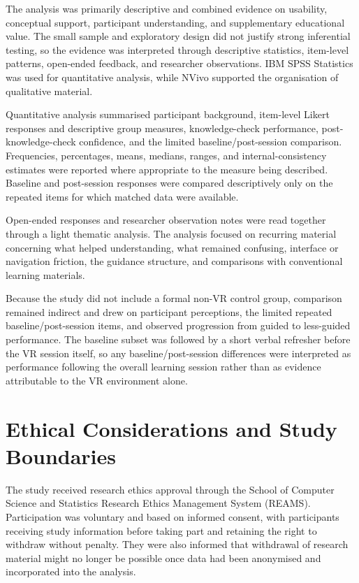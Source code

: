 The analysis was primarily descriptive and combined evidence on usability, conceptual support, participant understanding, and supplementary educational value. The small sample and exploratory design did not justify strong inferential testing, so the evidence was interpreted through descriptive statistics, item-level patterns, open-ended feedback, and researcher observations. IBM SPSS Statistics was used for quantitative analysis, while NVivo supported the organisation of qualitative material.

Quantitative analysis summarised participant background, item-level Likert responses and descriptive group measures, knowledge-check performance, post-knowledge-check confidence, and the limited baseline/post-session comparison. Frequencies, percentages, means, medians, ranges, and internal-consistency estimates were reported where appropriate to the measure being described. Baseline and post-session responses were compared descriptively only on the repeated items for which matched data were available.

Open-ended responses and researcher observation notes were read together through a light thematic analysis. The analysis focused on recurring material concerning what helped understanding, what remained confusing, interface or navigation friction, the guidance structure, and comparisons with conventional learning materials.

Because the study did not include a formal non-VR control group, comparison remained indirect and drew on participant perceptions, the limited repeated baseline/post-session items, and observed progression from guided to less-guided performance. The baseline subset was followed by a short verbal refresher before the VR session itself, so any baseline/post-session differences were interpreted as performance following the overall learning session rather than as evidence attributable to the VR environment alone.

\section{Ethical Considerations and Study Boundaries}

The study received research ethics approval through the School of Computer Science and Statistics Research Ethics Management System (REAMS). Participation was voluntary and based on informed consent, with participants receiving study information before taking part and retaining the right to withdraw without penalty. They were also informed that withdrawal of research material might no longer be possible once data had been anonymised and incorporated into the analysis.

